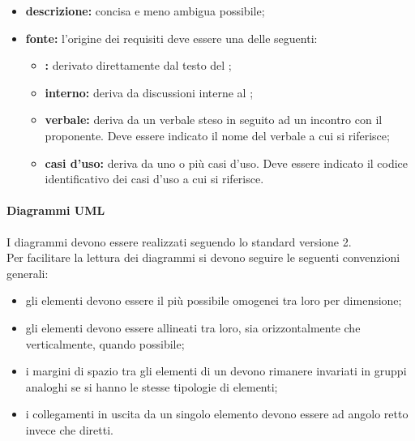             \begin{itemize}
                \item \textbf{descrizione:} concisa e meno ambigua possibile;
                \item \textbf{fonte:} l'origine dei requisiti deve essere una delle seguenti:
                \begin{itemize}
                    \item \textbf{:} derivato direttamente dal testo del ;
                    \item \textbf{interno:} deriva da discussioni interne al ;
                    \item \textbf{verbale:} deriva da un verbale steso in seguito ad un incontro con il proponente. Deve essere indicato il nome del verbale a cui si riferisce;
                    \item \textbf{casi d'uso:} deriva da uno o più casi d'uso. Deve essere indicato il codice identificativo dei casi d'uso a cui si riferisce.
                \end{itemize}
            \end{itemize}
            \paragraph{Diagrammi UML}
                I diagrammi  devono essere realizzati seguendo lo standard  versione 2. \\
                Per facilitare la lettura dei diagrammi si devono seguire le seguenti convenzioni generali:
                \begin{itemize}
                    \item gli elementi devono essere il più possibile omogenei tra loro per dimensione;
                    \item gli elementi devono essere allineati tra loro, sia orizzontalmente che verticalmente, quando possibile;
                    \item i margini di spazio tra gli elementi di un  devono rimanere invariati in gruppi analoghi se si hanno le stesse tipologie di elementi;
                    \item i collegamenti in uscita da un singolo elemento devono essere ad angolo retto invece che diretti.
                \end{itemize}

